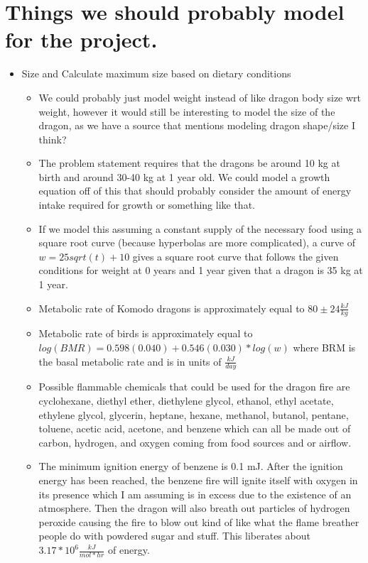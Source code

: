 \documentclass{article}
\begin{document}
\section{Things we should probably model for the project.}
\begin{itemize}
\item Size and Calculate maximum size based on dietary 
conditions
\begin{itemize}
    \item We could probably just model weight instead of like dragon body size wrt weight, however it would still be interesting to model the size of the dragon, as we have a source that mentions modeling dragon shape/size I think? 
    \item The problem statement requires that the dragons be around 10 kg at birth and around 30-40 kg at 1 year old. We could model a growth equation off of this that should probably consider the amount of energy intake required for growth or something like that. 
    \item If we model this assuming a constant supply of the necessary food using a square root curve (because hyperbolas are more complicated), a curve of $w=25sqrt(t)+10$ gives a square root curve that follows the given conditions for weight at 0 years and 1 year given that a dragon is 35 kg at 1 year.
    \item Metabolic rate of Komodo dragons is approximately equal to $80\pm24 \frac{kJ}{kg}$
    \item Metabolic rate of birds is approximately equal to $log(BMR)=0.598(0.040)+0.546(0.030)*log(w)$ where BRM is the basal metabolic rate and is in units of $\frac{kJ}{day}$
    \item Possible flammable chemicals that could be used for the dragon fire are cyclohexane, diethyl ether, diethylene glycol, ethanol, ethyl acetate, ethylene glycol, glycerin, heptane, hexane, methanol, butanol, pentane, toluene, acetic acid, acetone, and benzene which can all be made out of carbon, hydrogen, and oxygen coming from food sources and or airflow. 
    \item The minimum ignition energy of benzene is 0.1 mJ. After the ignition energy has been reached, the benzene fire will ignite itself with oxygen in its presence which I am assuming is in excess due to the existence of an atmosphere. Then the dragon will also breath out particles of hydrogen peroxide causing the fire to blow out kind of like what the flame breather people do with powdered sugar and stuff.  This liberates about $3.17*10^{6} \frac{kJ}{mol*hr}$ of energy. 

\end{itemize}
\end{itemize}
\end{document}
